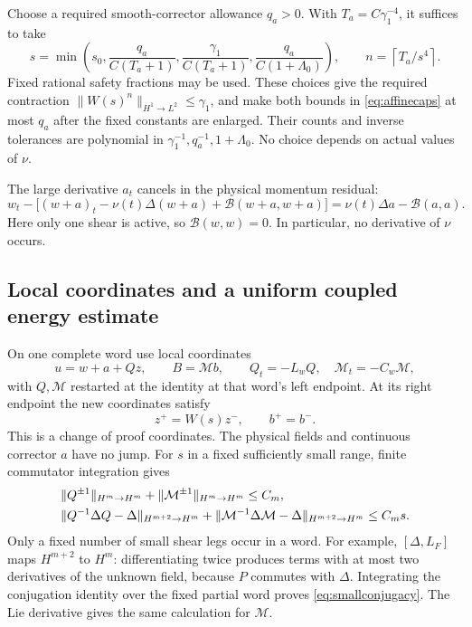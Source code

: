 \documentclass[11pt,a4paper]{amsart}
\theoremstyle{definition}
\theoremstyle{remark}
\numberwithin{equation}{section}
\newcommand{\Bcal}{\mathcal B}
\newcommand{\Mcal}{\mathcal M}
\newcommand{\norm}[1]{\lVert #1\rVert}
\begin{document}
Choose a required smooth-corrector allowance $q_a>0$. With
$T_a=C\gamma_1^{-4}$, it suffices to take
\begin{equation}\label{eq:resetwordchoice}
 s=\min\left(s_0,\frac{q_a}{C(T_a+1)},
                    \frac{\gamma_1}{C(T_a+1)},
                    \frac{q_a}{C(1+\Lambda_0)}\right),\qquad
 n=\left\lceil T_a/s^4\right\rceil.
\end{equation}
Fixed rational safety fractions may be used. These choices give the required contraction $\norm{W(s)^n}_{H^1\to L^2}\le\gamma_1$, and make both bounds in \eqref{eq:affinecaps} at most $q_a$ after the fixed constants are enlarged. Their counts and inverse tolerances are polynomial in $\gamma_1^{-1},q_a^{-1},1+\Lambda_0$. No choice depends on actual values of $\nu$.

The large derivative $a_t$ cancels in the physical momentum residual:
\begin{equation}\label{eq:aresidual}
 w_t-\bigl[(w+a)_t-\nu(t)\Delta(w+a)+\Bcal(w+a,w+a)\bigr]
 =\nu(t)\Delta a-\Bcal(a,a).
\end{equation}
Here only one shear is active, so $\Bcal(w,w)=0$. In particular, no derivative of $\nu$ occurs.

\subsection{Local coordinates and a uniform coupled energy estimate}
On one complete word use local coordinates
\begin{equation}\label{eq:resetcoords}
 u=w+a+Qz,\qquad B=\Mcal b,\qquad
 Q_t=-L_wQ,\quad\Mcal_t=-C_w\Mcal,
\end{equation}
with $Q,\Mcal$ restarted at the identity at that word's left endpoint. At its right endpoint the new coordinates satisfy
\begin{equation}\label{eq:coordinatejumps}
 z^+=W(s)z^-,\qquad b^+=b^-.
\end{equation}
This is a change of proof coordinates. The physical fields and continuous corrector $a$ have no jump.
For $s$ in a fixed sufficiently small range, finite commutator integration gives
\begin{align}\label{eq:smallconjugacy}
 &\norm{Q^{\pm1}}_{H^m\to H^m}+
   \norm{\Mcal^{\pm1}}_{H^m\to H^m}\le C_m,\notag\\
 &\norm{Q^{-1}\Delta Q-\Delta}_{H^{m+2}\to H^m}+
   \norm{\Mcal^{-1}\Delta\Mcal-\Delta}_{H^{m+2}\to H^m}\le C_ms.
\end{align}
Only a fixed number of small shear legs occur in a word. For example,
$[\Delta,L_F]$ maps $H^{m+2}$ to $H^m$: differentiating twice produces terms with at most two derivatives of the unknown field, because $P$ commutes with $\Delta$. Integrating the conjugation identity over the fixed partial word proves \eqref{eq:smallconjugacy}. The Lie derivative gives the same calculation for $\Mcal$.
\end{document}

